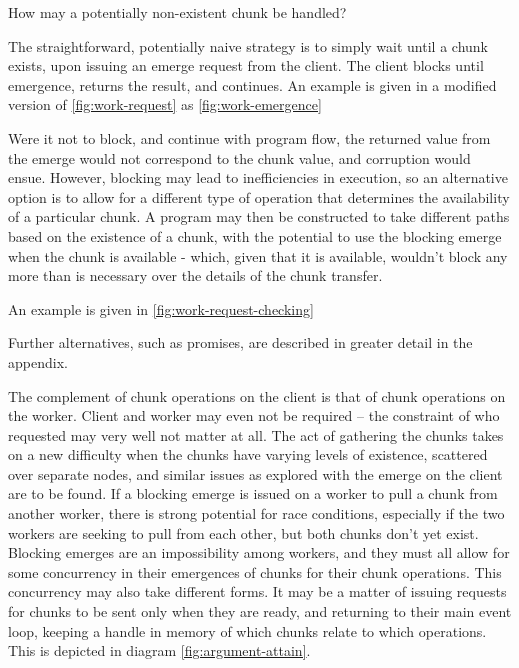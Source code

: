 How may a potentially non-existent chunk be handled?

The straightforward, potentially naive strategy is to simply wait until a chunk exists, upon issuing an emerge request from the client.
The client blocks until emergence, returns the result, and continues.
An example is given in a modified version of \cref{fig:work-request} as \cref{fig:work-emergence}


Were it not to block, and continue with program flow, the returned value from the emerge would not correspond to the chunk value, and corruption would ensue.
However, blocking may lead to inefficiencies in execution, so an alternative option is to allow for a different type of operation that determines the availability of a particular chunk.
A program may then be constructed to take different paths based on the existence of a chunk, with the potential to use the blocking emerge when the chunk is available - which, given that it is available, wouldn't block any more than is necessary over the details of the chunk transfer.

An example is given in \cref{fig:work-request-checking}


Further alternatives, such as promises, are described in greater detail in the appendix.

The complement of chunk operations on the client is that of chunk operations on the worker.
Client and worker may even not be required -- the constraint of who requested may very well not matter at all.
The act of gathering the chunks takes on a new difficulty when the chunks have varying levels of existence, scattered over separate nodes, and similar issues as explored with the emerge on the client are to be found.
If a blocking emerge is issued on a worker to pull a chunk from another worker, there is strong potential for race conditions, especially if the two workers are seeking to pull from each other, but both chunks don't yet exist.
Blocking emerges are an impossibility among workers, and they must all allow for some concurrency in their emergences of chunks for their chunk operations.
This concurrency may also take different forms.
It may be a matter of issuing requests for chunks to be sent only when they are ready, and returning to their main event loop, keeping a handle in memory of which chunks relate to which operations.
This is depicted in diagram \cref{fig:argument-attain}.

